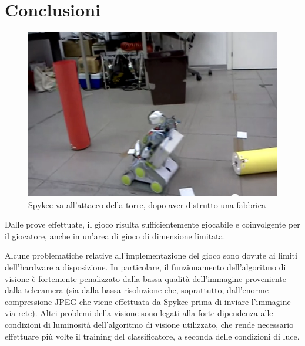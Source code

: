 \chapter{Conclusioni}
\label{cap:conclusioni}


\begin{figure}
\centering
\includegraphics[scale=0.7]{images/attaccotorre}
\caption{Spykee va all'attacco della torre, dopo aver distrutto una fabbrica}
\end{figure}

Dalle prove effettuate, il gioco risulta sufficientemente giocabile e coinvolgente per il giocatore, anche in un'area di gioco di dimensione limitata.

Alcune problematiche relative all'implementazione del gioco sono dovute ai limiti dell'hardware a disposizione. In particolare, il funzionamento dell'algoritmo di visione è fortemente penalizzato dalla bassa qualità dell'immagine proveniente dalla telecamera (sia dalla bassa risoluzione che, soprattutto, dall'enorme compressione JPEG che viene effettuata da Spykee prima di inviare l'immagine via rete). Altri problemi della visione sono legati alla forte dipendenza alle condizioni di luminosità dell'algoritmo di visione utilizzato, che rende necessario effettuare più volte il training del classificatore, a seconda delle condizioni di luce.



